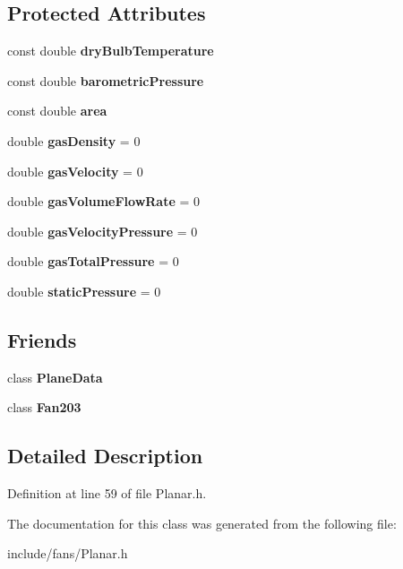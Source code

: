 \subsection*{Protected Attributes}
\begin{DoxyCompactItemize}
\item 
\mbox{\label{class_planar_afdc9d4149cae09c9e49aa323a814616c}} 
const double {\bfseries dry\+Bulb\+Temperature}
\item 
\mbox{\label{class_planar_a0a2be6e6cadb8550921914ecdd43b80f}} 
const double {\bfseries barometric\+Pressure}
\item 
\mbox{\label{class_planar_a561590931d1cb7b592eeba9f3685d3c3}} 
const double {\bfseries area}
\item 
\mbox{\label{class_planar_a3585f60cf8a2a9e4b80954118337c8cf}} 
double {\bfseries gas\+Density} = 0
\item 
\mbox{\label{class_planar_adf99a402e9af6a851ee94bd8dad5700a}} 
double {\bfseries gas\+Velocity} = 0
\item 
\mbox{\label{class_planar_a6597ec3a9de6863ecfe3c5e923048783}} 
double {\bfseries gas\+Volume\+Flow\+Rate} = 0
\item 
\mbox{\label{class_planar_a4bec44a97d38f8b98d3839c885350512}} 
double {\bfseries gas\+Velocity\+Pressure} = 0
\item 
\mbox{\label{class_planar_a67711087a384aa3165fb7990e72193c5}} 
double {\bfseries gas\+Total\+Pressure} = 0
\item 
\mbox{\label{class_planar_a4ee994f45b58125cbd81998a84f860a6}} 
double {\bfseries static\+Pressure} = 0
\end{DoxyCompactItemize}
\subsection*{Friends}
\begin{DoxyCompactItemize}
\item 
\mbox{\label{class_planar_a28ff438eefb65e97bddb4051dd0a0112}} 
class {\bfseries Plane\+Data}
\item 
\mbox{\label{class_planar_ace899f7afbdc2350f3651b93b809f2fd}} 
class {\bfseries Fan203}
\end{DoxyCompactItemize}


\subsection{Detailed Description}


Definition at line 59 of file Planar.\+h.



The documentation for this class was generated from the following file\+:\begin{DoxyCompactItemize}
\item 
include/fans/Planar.\+h\end{DoxyCompactItemize}
